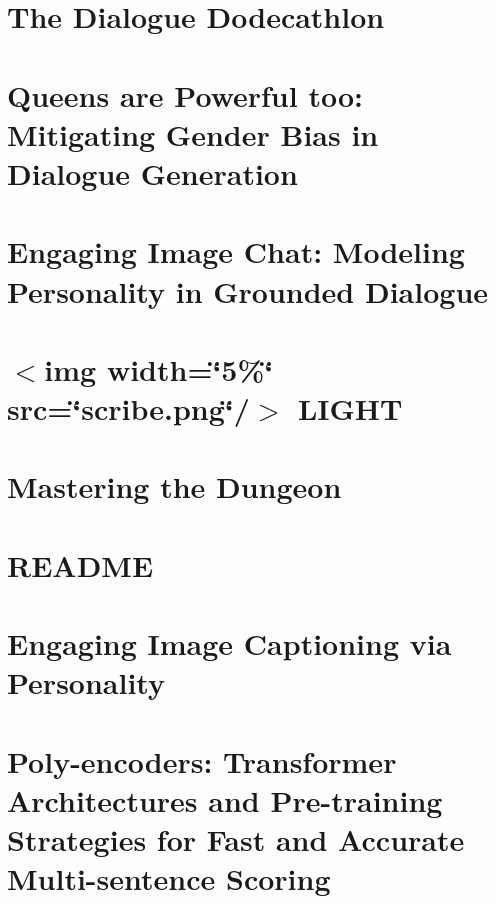 \documentclass[twoside]{book}
\newcommand{\+}{\discretionary{\mbox{\scriptsize$\hookleftarrow$}}{}{}}
\begin{document}
\chapter{The Dialogue Dodecathlon}
\label{md_projects_dodecadialogue_README}

\chapter{Queens are Powerful too\+: Mitigating Gender Bias in Dialogue Generation}
\label{md_projects_genderation_bias_README}

\chapter{Engaging Image Chat\+: Modeling Personality in Grounded Dialogue}
\label{md_projects_image_chat_README}

\chapter{$<$img width=\char`\"{}5\%\char`\"{} src=\char`\"{}scribe.\+png\char`\"{}/$>$ L\+I\+G\+HT}
\label{md_projects_light_README}

\chapter{Mastering the Dungeon}
\label{md_projects_mastering_the_dungeon_README}

\chapter{R\+E\+A\+D\+ME}
\label{md_projects_personachat_README}

\chapter{Engaging Image Captioning via Personality}
\label{md_projects_personality_captions_README}

\chapter{Poly-\/encoders\+: Transformer Architectures and Pre-\/training Strategies for Fast and Accurate Multi-\/sentence Scoring}
\label{md_projects_polyencoder_README}

\end{document}
